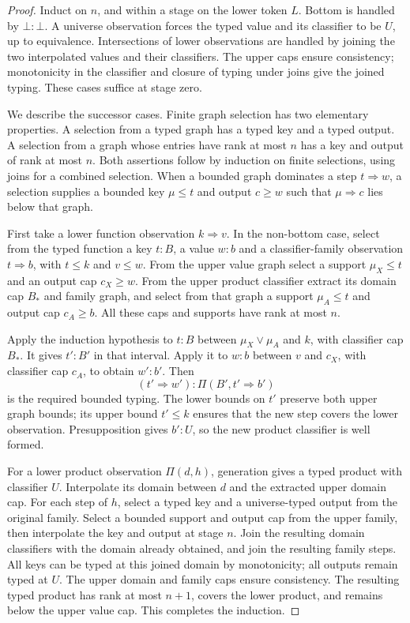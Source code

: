 \documentclass[11pt,a4paper]{article}
\theoremstyle{definition}
\theoremstyle{remark}
\begin{document}
\begin{proof}
Induct on $n$, and within a stage on the lower token $L$. Bottom is
handled by $\bot:\bot$. A universe observation forces the typed value
and its classifier to be $U$, up to equivalence. Intersections of lower
observations are handled by joining the two interpolated values and
their classifiers. The upper caps ensure consistency; monotonicity in
the classifier and closure of typing under joins give the joined typing.
These cases suffice at stage zero.

We describe the successor cases. Finite graph selection has two
elementary properties. A selection from a typed graph has a typed key
and a typed output. A selection from a graph whose entries have rank at
most $n$ has a key and output of rank at most $n$. Both assertions
follow by induction on finite selections, using joins for a combined
selection. When a bounded graph dominates a step $t\Rightarrow w$, a
selection supplies a bounded key $\mu\leq t$ and output $c\geq w$
such that $\mu\Rightarrow c$ lies below that graph.

First take a lower function observation $k\Rightarrow v$. In the
non-bottom case, select from the typed function a key $t:B$, a value
$w:b$ and a classifier-family observation $t\Rightarrow b$, with
$t\leq k$ and $v\leq w$. From the upper value graph select a support
$\mu_X\leq t$ and an output cap $c_X\geq w$. From the upper product
classifier extract its domain cap $B_*$ and family graph, and select
from that graph a support $\mu_A\leq t$ and output cap $c_A\geq b$.
All these caps and supports have rank at most $n$.

Apply the induction hypothesis to $t:B$ between
$\mu_X\vee\mu_A$ and $k$, with classifier cap $B_*$. It gives
$t':B'$ in that interval. Apply it to $w:b$ between $v$ and $c_X$,
with classifier cap $c_A$, to obtain $w':b'$. Then
\[
 (t'\Rightarrow w'):\Pi(B',t'\Rightarrow b')
\]
is the required bounded typing. The lower bounds on $t'$ preserve both
upper graph bounds; its upper bound $t'\leq k$ ensures that the new
step covers the lower observation. Presupposition gives $b':U$, so the
new product classifier is well formed.

For a lower product observation $\Pi(d,h)$, generation gives a typed
product with classifier $U$. Interpolate its domain between $d$ and
the extracted upper domain cap. For each step of $h$, select a typed
key and a universe-typed output from the original family. Select a
bounded support and output cap from the upper family, then interpolate
the key and output at stage $n$. Join the resulting domain classifiers
with the domain already obtained, and join the resulting family steps.
All keys can be typed at this joined domain by monotonicity; all outputs
remain typed at $U$. The upper domain and family caps ensure consistency.
The resulting typed product has rank at most $n+1$, covers the lower
product, and remains below the upper value cap. This completes the
induction.
\end{proof}
\end{document}
